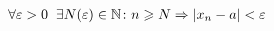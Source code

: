 \documentclass[preview]{standalone}
\begin{document}
\begin{align*}
\forall \varepsilon >0\hspace{2mm} \exists N(\varepsilon )\in \mathbb {N} \colon n\geqslant N \Rightarrow |x_{n} - a|<\varepsilon
\end{align*}
\end{document}
